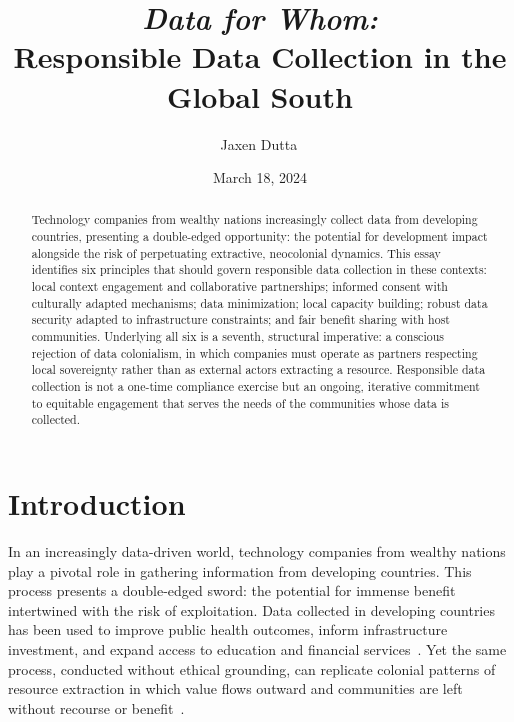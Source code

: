\documentclass[11pt,showkeys]{essay}
\begin{document}
\title{\textit{Data for Whom:}\\
Responsible Data Collection in the Global South}

\author{Jaxen Dutta\,}

\date{March 18, 2024}

\begin{abstract}
Technology companies from wealthy nations increasingly collect data from developing countries, presenting a double-edged opportunity: the potential for development impact alongside the risk of perpetuating extractive, neocolonial dynamics. This essay identifies six principles that should govern responsible data collection in these contexts: local context engagement and collaborative partnerships; informed consent with culturally adapted mechanisms; data minimization; local capacity building; robust data security adapted to infrastructure constraints; and fair benefit sharing with host communities. Underlying all six is a seventh, structural imperative: a conscious rejection of data colonialism, in which companies must operate as partners respecting local sovereignty rather than as external actors extracting a resource. Responsible data collection is not a one-time compliance exercise but an ongoing, iterative commitment to equitable engagement that serves the needs of the communities whose data is collected.
\end{abstract}


\maketitle

\section{Introduction}

In an increasingly data-driven world, technology companies from wealthy nations play a pivotal role in gathering information from developing countries. This process presents a double-edged sword: the potential for immense benefit intertwined with the risk of exploitation. Data collected in developing countries has been used to improve public health outcomes, inform infrastructure investment, and expand access to education and financial services~\cite{runde_innovative_2022}. Yet the same process, conducted without ethical grounding, can replicate colonial patterns of resource extraction in which value flows outward and communities are left without recourse or benefit~\cite{edwards_slave_2017}.
\end{document}
